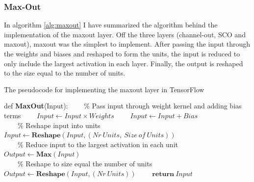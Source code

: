 \subsubsection*{Max-Out}
In algorithm \ref{alg:maxout} I have summarized the algorithm behind the implementation of the maxout layer.
Off the three layers (channel-out, \ac{SCO} and maxout), maxout was the simplest to implement. After passing 
the input through the weights and biases and reshaped to form the units, the input is reduced to only include 
the largest activation in each layer. Finally, the output is reshaped to the size equal to the number of units.
\begin{algorithm}
    \caption{The pseudocode for implementing the maxout layer in TensorFlow}\label{alg:maxout}
    \begin{algorithmic}[1]
    \State def \textbf{MaxOut}(Input): 
    \State \ \ \ \ $\%$ Pass input through weight kernel and adding bias terms
    \State \ \ \ \ $Input \gets Input \times Weights$
    \State \ \ \ \ $Input \gets Input + Bias$
    \\
    \State \ \ \ \ $\%$ Reshape input into units
    \State \ \ \ \ $Input \gets \textbf{Reshape}(Input,(Nr\ Units,\ Size \ of \ Units))$
    \\
    \State \ \ \ \ $\%$ Reduce input to the largest activation in each unit
    \State \ \ \ \ $Output \gets \textbf{Max}(Input)$
    \\
    \State \ \ \ \ $\%$ Reshape to size equal the number of units
    \State \ \ \ \ $Output \gets \textbf{Reshape}(Input,(Nr \ Units))$
    \State \ \ \ \ $\textbf{return}\ Input$
    \end{algorithmic}
\end{algorithm}
